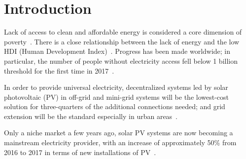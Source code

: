 \documentclass[review]{elsarticle}
\begin{document}
\section{Introduction}
Lack of access to clean and affordable energy is considered a core dimension of poverty~\citep{Hussein2012}. There is a close relationship between the lack of energy and the low HDI (Human Development Index)~\citep{Coelho}. Progress has been made worldwide; in particular, the number of people without electricity access fell below 1 billion threshold for the first time in 2017~\citep{IEAweo2018}. %

In order to provide universal electricity, decentralized systems led by solar photovoltaic (PV) in off-grid and mini-grid systems will be the lowest-cost solution for three-quarters of the additional connections needed; and grid extension will be the standard especially in urban areas~\citep{IEAweo2018}.

%
Only a niche market a few years ago, solar PV systems are now becoming a mainstream electricity provider, with an increase of approximately 50\% from 2016 to 2017 in terms of new installations of PV~\citep{EPIA}. %
\end{document}
